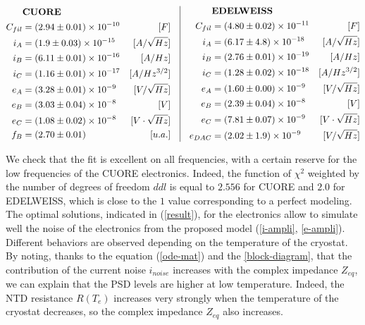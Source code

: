 \begin{align}
\label{result}
\begin{aligned}[c]
& \textrm{\textbf{CUORE}} \\
C_{fil} &= (2.94 \pm 0.01)\times 10^{-10}&[F] \\
i_A &= (1.9 \pm 0.03) \times 10^{-15}&[A/\sqrt{Hz}] \\
i_B &= (6.11 \pm 0.01) \times 10^{-16}&[A/Hz] \\
i_C &= (1.16 \pm 0.01) \times 10^{-17}&[A/Hz^{3/2}] \\
e_A &= (3.28 \pm 0.01) \times 10^{-9} &[V/\sqrt{Hz}] \\
e_B &= (3.03 \pm 0.04) \times 10^{-8}&[V] \\
e_C &= (1.08 \pm 0.02) \times 10^{-8} &[V \cdot \sqrt{Hz}] \\
f_B &= (2.70 \pm 0.01) & [u.a.]
\end{aligned}
\quad \vrule{} \quad
\begin{aligned}[c]
& \textrm{\textbf{EDELWEISS}} \\
C_{fil} &= (4.80 \pm 0.02)\times 10^{-11}&[F] \\
i_A &= (6.17 \pm 4.8) \times 10^{-18}&[A/\sqrt{Hz}] \\
i_B &= (2.76 \pm 0.01) \times 10^{-19}&[A/Hz] \\
i_C &= (1.28 \pm 0.02) \times 10^{-18}&[A/Hz^{3/2}] \\
e_A &= (1.60 \pm 0.00) \times 10^{-9} &[V/\sqrt{Hz}] \\
e_B &= (2.39 \pm 0.04) \times 10^{-8}&[V] \\
e_C &= (7.81 \pm 0.07) \times 10^{-9} &[V \cdot \sqrt{Hz}] \\
e_{DAC} &= (2.02 \pm 1.9) \times 10^{-9}&[V/\sqrt{Hz}] 
\end{aligned}
\end{align}

We check that the fit is excellent on all frequencies, with a certain reserve for the low frequencies of the CUORE electronics. Indeed, the function of $\chi^2$ weighted by the number of degrees of freedom $ddl$ is equal to $2.556$ for CUORE and $2.0$ for EDELWEISS, which is close to the $1$ value corresponding to a perfect modeling. The optimal solutions, indicated in (\ref{result}), for the electronics allow to simulate well the noise of the electronics from the proposed model (\ref{i-ampli}, \ref{e-ampli}). Different behaviors are observed depending on the temperature of the cryostat.  By noting, thanks to the equation (\ref{ode-mat}) and the \ref{block-diagram}, that the contribution of the current noise $i_{noise}$ increases with the complex impedance $Z_{eq}$, we can explain that the PSD levels are higher at low temperature. Indeed, the NTD resistance $R(T_e)$ increases very strongly when the temperature of the cryostat decreases, so the complex impedance $Z_{eq}$ also increases.

